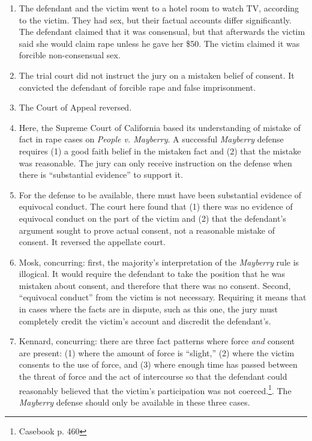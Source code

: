 \begin{enumerate}
    \item The defendant and the victim went to a hotel room to watch TV, 
    according to the victim. They had sex, but 
    their factual accounts differ significantly. The defendant claimed that it 
    was consensual, but that afterwards the victim said she would claim rape 
    unless he gave her \$50. The victim claimed it was forcible non-consensual 
    sex.
    \item The trial court did not instruct the jury on a mistaken belief of 
    consent. It convicted the defendant of forcible rape and false 
    imprisonment.
    \item The Court of Appeal reversed.
    \item Here, the Supreme Court of California based its understanding of 
    mistake of fact in rape cases on \emph{People v. Mayberry}. A successful 
    \emph{Mayberry} defense requires (1) a good faith belief in the mistaken 
    fact and (2) that the mistake was reasonable. The jury can only receive 
    instruction on the defense when there is ``substantial evidence'' to 
    support it.
    \item For the defense to be available, there must have been substantial 
    evidence of equivocal conduct. The court here found that (1) there was no 
    evidence of equivocal conduct on the part of the victim and (2) that the 
    defendant's argument sought to prove actual consent, not a reasonable 
    mistake of consent. It reversed the appellate court.
    \item Mosk, concurring: first, the majority's interpretation of the 
    \emph{Mayberry} rule is illogical. It would require the defendant to take 
    the position that he was mistaken about consent, and therefore that there 
    was no consent. Second, ``equivocal conduct'' from the victim is not 
    necessary. Requiring it means that in cases where the facts are in 
    dispute, such as this one, the jury must completely credit the victim's 
    account and discredit the defendant's.
    \item Kennard, concurring: there are three fact patterns where force 
    \emph{and} consent are present: (1) where the amount of force is 
    ``slight,'' (2) where the victim consents to the use of force, and (3) 
    where enough time has passed between the threat of force and the act of 
    intercourse so that the defendant could reasonably believed that the 
    victim's participation was not coerced.\footnote{Casebook p. 460}. The 
    \emph{Mayberry} defense should only be available in these three cases.
\end{enumerate}

